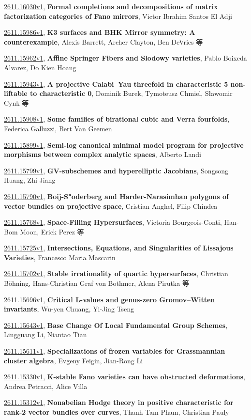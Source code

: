 \documentclass[9pt, a4paper]{article}
\theoremstyle{plain}
\theoremstyle{definition}
\theoremstyle{remark}
\newcommand{\arxiv}[3]{\href{https://arxiv.org/abs/#1}{#1}, \textbf{\textcolor{arxivblue}{#2}}, #3}
\begin{document}
\arxiv{2611.16030v1}{Formal completions and decompositions of matrix factorization categories of Fano mirrors}{Victor Ibrahim Santos El Adji}

\arxiv{2611.15986v1}{K3 surfaces and BHK Mirror symmetry: A counterexample}{Alexis Barrett, Archer Clayton, Ben DeVries 等}

\arxiv{2611.15962v1}{Affine Springer Fibers and Slodowy varieties}{Pablo Boixeda Alvarez, Do Kien Hoang}

\arxiv{2611.15943v1}{A projective Calabi--Yau threefold in characteristic 5 non-liftable to characteristic 0}{Dominik Burek, Tymoteusz Chmiel, Sławomir Cynk 等}

\arxiv{2611.15908v1}{Some families of birational cubic and Verra fourfolds}{Federica Galluzzi, Bert Van Geemen}

\arxiv{2611.15899v1}{Semi-log canonical minimal model program for projective morphisms between complex analytic spaces}{Alberto Landi}

\arxiv{2611.15799v1}{GV-subschemes and hyperelliptic Jacobians}{Songsong Huang, Zhi Jiang}

\arxiv{2611.15790v1}{Boij-S"oderberg and Harder-Narasimhan polygons of vector bundles on projective space}{Cristian Anghel, Filip Chindea}

\arxiv{2611.15768v1}{Space-Filling Hypersurfaces}{Victoria Bourgeois-Conti, Han-Bom Moon, Erick Perez 等}

\arxiv{2611.15725v1}{Intersections, Equations, and Singularities of Lissajous Varieties}{Francesco Maria Mascarin}

\arxiv{2611.15702v1}{Stable irrationality of quartic hypersurfaces}{Christian Böhning, Hans-Christian Graf von Bothmer, Alena Pirutka 等}

\arxiv{2611.15696v1}{Critical L-values and genus-zero Gromov--Witten invariants}{Wu-yen Chuang, Yi-Jing Tseng}

\arxiv{2611.15643v1}{Base Change Of Local Fundamental Group Schemes}{Lingguang Li, Niantao Tian}

\arxiv{2611.15611v1}{Specializations of frozen variables for Grassmannian cluster algebra}{Evgeny Feigin, Jian-Rong Li}

\arxiv{2611.15330v1}{K-stable Fano varieties can have obstructed deformations}{Andrea Petracci, Alice Villa}

\arxiv{2611.15312v1}{Nonabelian Hodge theory in positive characteristic for rank-2 vector bundles over curves}{Thanh Tam Pham, Christian Pauly}
\end{document}
